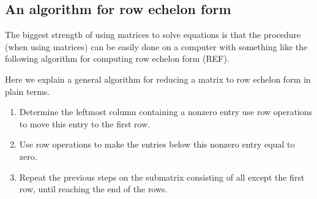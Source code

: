 \documentclass{ximera}
\begin{document}




\subsection{An algorithm for row echelon form}

The biggest strength of using matrices to solve equations is that the
procedure (when using matrices) can be easily done on a computer with
something like the following algorithm for computing row echelon form
(REF).

\begin{algorithm}
  Here we explain a general algorithm for reducing a matrix to row
  echelon form in plain terms.
  \begin{enumerate}
  \item Determine the leftmost column containing a nonzero entry use
    row operations to move this entry to the first row.
  \item Use row operations to make the entries below this nonzero entry equal to zero.
  \item Repeat the previous steps on the submatrix consisting of all
    except the first row, until reaching the end of the rows.
  \end{enumerate}
\end{algorithm}
\end{document}

